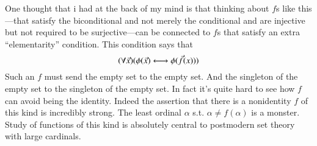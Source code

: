 \documentclass{book}
\begin{document}
\bigskip

One thought that i had at the back of my mind is that thinking about
$f$s like this---that satisfy the biconditional and not merely the
conditional and are injective but not required to be surjective---can
be connected to $f$s that satisfy an extra ``elementarity'' condition.
This condition says that
$$(\forall \vec x)(\phi(\vec x) \longleftrightarrow \phi(\vec f(x)))$$
Such an $f$ must send the empty set to the empty set. And the
singleton of the empty set to the singleton of the empty set.  In fact
it's quite hard to see how $f$ can avoid being the identity.  Indeed the
assertion that there is a nonidentity $f$ of this kind is incredibly
strong.  The least ordinal $\alpha$ s.t. $\alpha \not= f(\alpha)$ is a
monster.  Study of functions of this kind is absolutely central to
postmodern set theory with large cardinals.
\end{document}
